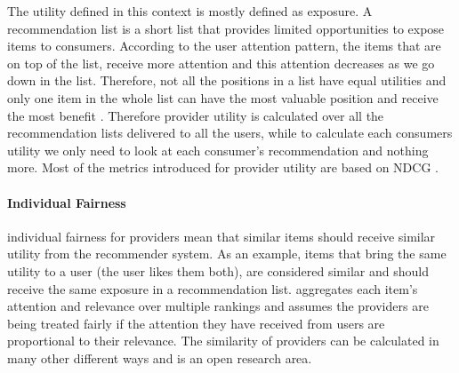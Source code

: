 The utility defined in this context is mostly defined as exposure. A recommendation list is a short list that provides limited opportunities to expose items to consumers. According to the user attention pattern, the items that are on top of the list, receive more attention and this attention decreases as we go down in the list. Therefore, not all the positions in a list have equal utilities and only one item in the whole list can have the most valuable position and receive the most benefit \cite{diaz2020}. Therefore provider utility is calculated over all the recommendation lists delivered to all the users, while to calculate each consumers utility we only need to look at each consumer's recommendation and nothing more. Most of the metrics introduced for provider utility are based on NDCG \cite{biega2018equity}.

\paragraph{Individual Fairness}
individual fairness for providers mean that similar items should receive similar utility from the recommender system. As an example, items that bring the same utility to a user (the user likes them both), are considered similar and should receive the same exposure in a recommendation list. \cite{biega2018equity} aggregates each item's attention and relevance over multiple rankings and assumes the providers are being treated fairly if the attention they have received from users are proportional to their relevance. The similarity of providers can be calculated in many other different ways and is an open research area.
    

